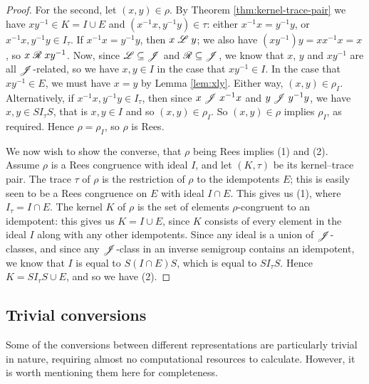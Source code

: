 \begin{theorem}
\begin{proof}
    For the second, let $(x,y) \in \rho$.  By Theorem
    \ref{thm:kernel-trace-pair} we have $xy^{-1} \in K = I \cup E$ and
    $(x^{-1}x, y^{-1}y) \in \tau$: either $x^{-1}x=y^{-1}y$, or
    $x^{-1}x,y^{-1}y \in I_\tau$.  If $x^{-1}x = y^{-1}y$, then $x \mathrel{\mathscr{L}} y$; we
    also have $(xy^{-1})y = xx^{-1}x = x$, so $x \mathrel{\mathscr{R}} xy^{-1}$.  Now, since
    $\mathscr{L} \subseteq \mathscr{J}$ and $\mathscr{R} \subseteq \mathscr{J}$, we know that $x$, $y$ and
    $xy^{-1}$ are all $\mathrel{\mathscr{J}}$-related, so we have $x,y \in I$ in the case that
    $xy^{-1} \in I$.  In the case that $xy^{-1} \in E$, we must have $x=y$ by
    Lemma \ref{lem:xly}.  Either way, $(x,y) \in \rho_I$.  Alternatively, if
    $x^{-1}x, y^{-1}y \in I_\tau$, then since $x \mathrel{\mathscr{J}} x^{-1}x$ and
    $y \mathrel{\mathscr{J}} y^{-1}y$, we have $x,y \in SI_\tau S$, that is $x,y \in I$ and so
    $(x,y) \in \rho_I$.  So $(x,y) \in \rho$ implies $\rho_I$, as required.
    Hence $\rho = \rho_I$, so $\rho$ is Rees.

    We now wish to show the converse, that $\rho$ being Rees implies (1) and
    (2).  Assume $\rho$ is a Rees congruence with ideal $I$, and let $(K,\tau)$
    be its kernel--trace pair.  The trace $\tau$ of $\rho$ is the restriction of
    $\rho$ to the idempotents $E$; this is easily seen to be a Rees congruence
    on $E$ with ideal $I \cap E$.  This gives us (1), where $I_\tau = I \cap E$.
    The kernel $K$ of $\rho$ is the set of elements $\rho$-congruent to an
    idempotent: this gives us $K = I \cup E$, since $K$ consists of every
    element in the ideal $I$ along with any other idempotents.  Since any ideal
    is a union of $\mathrel{\mathscr{J}}$-classes, and since any $\mathrel{\mathscr{J}}$-class in an inverse
    semigroup contains an idempotent, we know that $I$ is equal to
    $S(I \cap E)S$, which is equal to $S I_\tau S$.  Hence
    $K = S I_\tau S \cup E$, and so we have (2).
  \end{proof}
\end{theorem}

\subsection{Trivial conversions}
\label{sec:trivial-conversions}
Some of the conversions between different representations are particularly
trivial in nature, requiring almost no computational resources to calculate.
However, it is worth mentioning them here for completeness.

